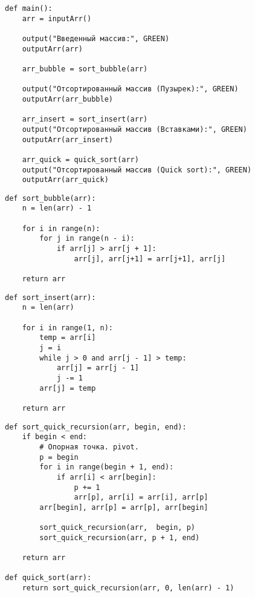 \begin{lstlisting}[label=some-code,caption=Главная функция main]
def main():
	arr = inputArr()

	output("Введенный массив:", GREEN)
	outputArr(arr)

	arr_bubble = sort_bubble(arr)

	output("Отсортированный массив (Пузырек):", GREEN)
	outputArr(arr_bubble)

	arr_insert = sort_insert(arr)
	output("Отсортированный массив (Вставками):", GREEN)
	outputArr(arr_insert)

	arr_quick = quick_sort(arr)
	output("Отсортированный массив (Quick sort):", GREEN)
	outputArr(arr_quick)
\end{lstlisting}

\begin{lstlisting}[label=some-code,caption=Сортировка пузырьком]
	def sort_bubble(arr):
    n = len(arr) - 1

    for i in range(n):
        for j in range(n - i):
            if arr[j] > arr[j + 1]:
                arr[j], arr[j+1] = arr[j+1], arr[j] 

    return arr
\end{lstlisting}

\begin{lstlisting}[label=some-code,caption=Сортировка вставками]
def sort_insert(arr):
    n = len(arr)

    for i in range(1, n):
        temp = arr[i]
        j = i
        while j > 0 and arr[j - 1] > temp:
            arr[j] = arr[j - 1]
            j -= 1
        arr[j] = temp

    return arr
\end{lstlisting}

\begin{lstlisting}[label=some-code,caption=QuickSort]
def sort_quick_recursion(arr, begin, end):
    if begin < end:
        # Опорная точка. pivot.
        p = begin
        for i in range(begin + 1, end):
            if arr[i] < arr[begin]:
                p += 1
                arr[p], arr[i] = arr[i], arr[p]
        arr[begin], arr[p] = arr[p], arr[begin] 
        
        sort_quick_recursion(arr,  begin, p)
        sort_quick_recursion(arr, p + 1, end)

	return arr
	
def quick_sort(arr):
    return sort_quick_recursion(arr, 0, len(arr) - 1)
\end{lstlisting}


